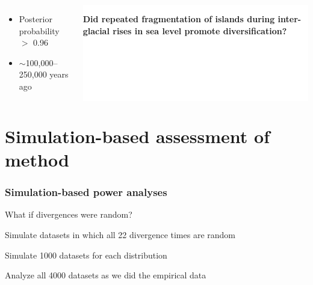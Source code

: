 {\begin{frame}
\begin{columns}
\begin{uncoverenv}
{\begin{minipage}[t]{0.7\textwidth}
\begin{adjustwidth}{-2.7em}{}
\begin{itemize}
                \item Posterior probability $>$ 0.96 \\
            
                \item $\sim$100,000--250,000 years ago
            \end{itemize}
            \end{adjustwidth}
            \end{minipage}
        }
        \end{uncoverenv}


        \vspace{-2cm}

        \colorbox{white}{
            \begin{minipage}[t]{1.0\textwidth}
                \raggedright
                \textbf{Did repeated fragmentation of islands during
                    inter-glacial rises in sea level promote diversification?}
            \end{minipage}
        }
    \end{columns}
\end{frame}
}

\section{Simulation-based assessment of method}

\begin{frame}
    \frametitle{Simulation-based power analyses}
    \begin{myitemize}
        \item<1-> What if divergences were random?
        \item<2-> Simulate datasets in which all 22 divergence times are random
        \item<4-> Simulate 1000 datasets for each \divTime{} distribution
        \item<4-> Analyze all 4000 datasets as we did the empirical data
    \end{myitemize}
\end{frame}


